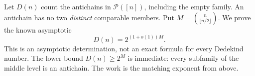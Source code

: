 Let $D(n)$ count the antichains in $\mathcal P([n])$, including the empty family. An antichain has no two \emph{distinct} comparable members. Put $M=\binom n{\lfloor n/2\rfloor}$. We prove the known asymptotic
\[D(n)=2^{(1+o(1))M}.\tag{1}\]
This is an asymptotic determination, not an exact formula for every Dedekind number. The lower bound $D(n)\ge2^M$ is immediate: every subfamily of the middle level is an antichain. The work is the matching exponent from above.
